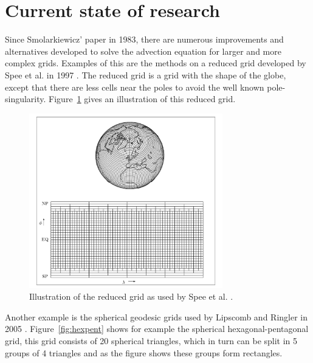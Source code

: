 \documentclass[10pt, a4paper]{article}
\newcommand{\imsize}{}
\begin{document}
\section{Current state of research}
Since Smolarkiewicz' paper in 1983, there are numerous improvements and alternatives developed to solve the advection equation for larger and more complex grids. Examples of this are the methods on a reduced grid developed by Spee et al. in 1997 \cite{spee}. The reduced grid is a grid with the shape of the globe, except that there are less cells near the poles to avoid the well known pole-singularity. Figure~\ref{fig:redgrid} gives an illustration of this reduced grid.

\begin{figure}[htp]
\centering
\renewcommand{\imsize}{0.75\textwidth}%
\includegraphics[width=\imsize]{figures/globe}%
\caption{\label{fig:redgrid} Illustration of the reduced grid as used by Spee et al. \cite{spee}.}
\end{figure}

Another example is the spherical geodesic grids used by Lipscomb and Ringler in 2005 \cite{lipscomb}. Figure~\ref{fig:hexpent} shows for example the spherical hexagonal-pentagonal grid, this grid consists of 20 spherical triangles, which in turn can be split in 5 groups of 4 triangles and as the figure shows these groups form rectangles.
\end{document}

